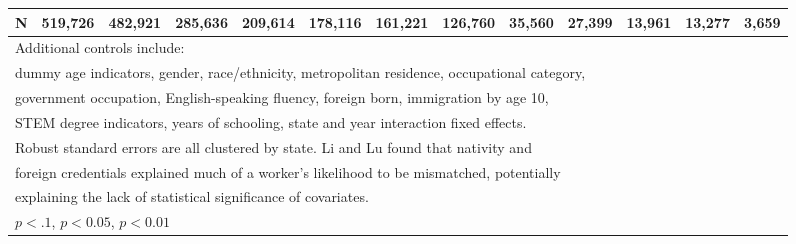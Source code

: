 \begin{table}[htbp]
\begin{tabular}{l*{12}{c}}
N                   &     519,726         &     482,921         &     285,636         &     209,614         &     178,116         &     161,221         &     126,760         &      35,560         &      27,399         &      13,961         &      13,277         &       3,659         \\
\bottomrule
\multicolumn{13}{l}{\footnotesize Additional controls include:}\\
\multicolumn{13}{l}{\footnotesize dummy age indicators, gender, race/ethnicity, metropolitan residence, occupational category,}\\
\multicolumn{13}{l}{\footnotesize government occupation, English-speaking fluency, foreign born, immigration by age 10,}\\
\multicolumn{13}{l}{\footnotesize STEM degree indicators, years of schooling, state and year interaction fixed effects.}\\
\multicolumn{13}{l}{\footnotesize Robust standard errors are all clustered by state. Li and Lu found that nativity and}\\
\multicolumn{13}{l}{\footnotesize foreign credentials explained much of a worker's likelihood to be mismatched, potentially}\\
\multicolumn{13}{l}{\footnotesize explaining the lack of statistical significance of covariates.}\\
\multicolumn{13}{l}{\footnotesize \sym{*} \(p<.1\), \sym{**} \(p<0.05\), \sym{***} \(p<0.01\)}\\
\end{tabular}
\end{table}
